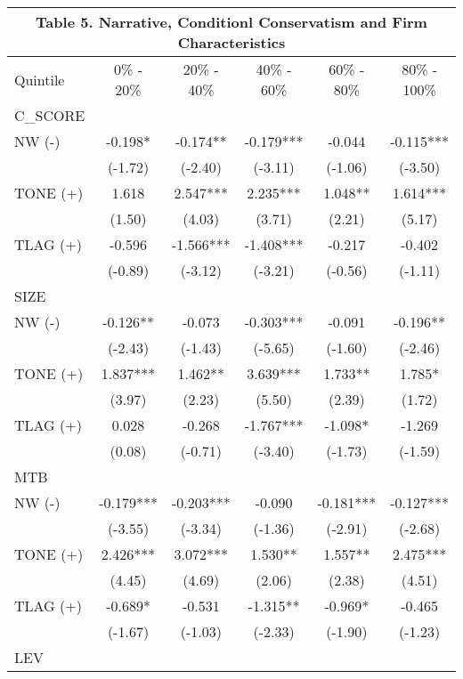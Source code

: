 \begin{table}[H]	\label{T5}%
	\centering
	\begin{tabular}{lccccc}
		\multicolumn{6}{c}{\textbf{Table 5. Narrative, Conditionl Conservatism and Firm Characteristics}} \\
		\midrule
		\midrule
		Quintile & 0\% - 20\% & 20\% - 40\% & 40\% - 60\% & 60\% - 80\% & 80\% - 100\% \\
		\midrule
		C\_SCORE &  &  &  &  &  \\
		\midrule
		NW (-) & -0.198* & -0.174** & -0.179*** & -0.044 & -0.115*** \\
		& (-1.72) & (-2.40) & (-3.11) & (-1.06) & (-3.50) \\
		TONE (+) & 1.618 & 2.547*** & 2.235*** & 1.048** & 1.614*** \\
		& (1.50) & (4.03) & (3.71) & (2.21) & (5.17) \\
		TLAG (+) & -0.596 & -1.566*** & -1.408*** & -0.217 & -0.402 \\
		& (-0.89) & (-3.12) & (-3.21) & (-0.56) & (-1.11) \\
		\midrule
		SIZE &   &   &   &   &  \\
		\midrule
		NW (-) & -0.126** & -0.073 & -0.303*** & -0.091 & -0.196** \\
		& (-2.43) & (-1.43) & (-5.65) & (-1.60) & (-2.46) \\
		TONE (+) & 1.837*** & 1.462** & 3.639*** & 1.733** & 1.785* \\
		& (3.97) & (2.23) & (5.50) & (2.39) & (1.72) \\
		TLAG (+) & 0.028 & -0.268 & -1.767*** & -1.098* & -1.269 \\
		& (0.08) & (-0.71) & (-3.40) & (-1.73) & (-1.59) \\
		\midrule
		MTB &   &   &   &   &  \\
		\midrule
		NW (-) & -0.179*** & -0.203*** & -0.090 & -0.181*** & -0.127*** \\
		& (-3.55) & (-3.34) & (-1.36) & (-2.91) & (-2.68) \\
		TONE (+) & 2.426*** & 3.072*** & 1.530** & 1.557** & 2.475*** \\
		& (4.45) & (4.69) & (2.06) & (2.38) & (4.51) \\
		TLAG (+) & -0.689* & -0.531 & -1.315** & -0.969* & -0.465 \\
		& (-1.67) & (-1.03) & (-2.33) & (-1.90) & (-1.23) \\
		\midrule
		LEV &   &   &   &   &  \\

\end{tabular}
\end{table}
